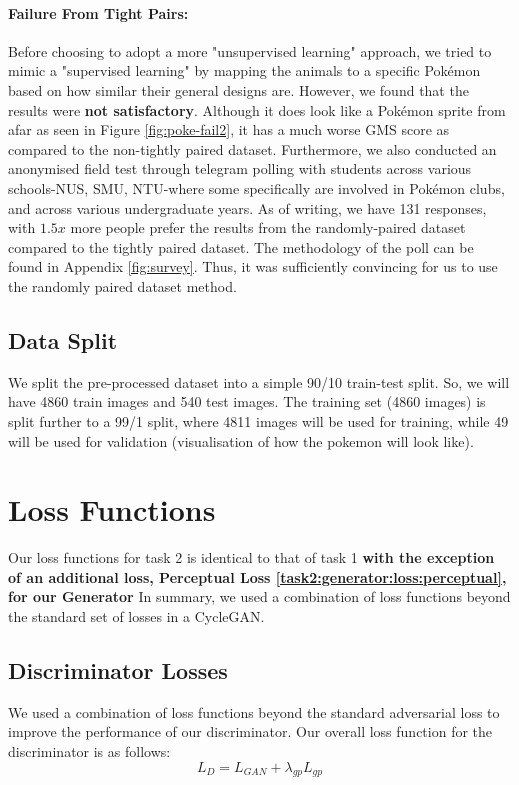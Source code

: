 \documentclass[twoside,english,notitlepage]{report}
\begin{document}
\paragraph{Failure From Tight Pairs:} Before choosing to adopt a more "unsupervised learning" approach, we tried to mimic a "supervised learning" by mapping the animals to a specific Pokémon based on how similar their general designs are. However, we found that the results were \textbf{not satisfactory}. Although it does look like a Pokémon sprite from afar as seen in Figure \ref{fig:poke-fail2}, it has a much worse GMS score as compared to the non-tightly paired dataset. Furthermore, we also conducted an anonymised field test through telegram polling with students across various schools-NUS, SMU, NTU-where some specifically are involved in Pokémon clubs, and across various undergraduate years. As of writing, we have 131 responses, with $1.5x$ more people prefer the results from the randomly-paired dataset compared to the tightly paired dataset. The methodology of the poll can be found in Appendix \ref{fig:survey}. Thus, it was sufficiently convincing for us to use the randomly paired dataset method.

\subsection{Data Split}

We split the pre-processed dataset into a simple 90/10 train-test split. So, we will have 4860 train images and 540 test images. The training set (4860 images) is split further to a 99/1 split, where 4811 images will be used for training, while 49 will be used for validation (visualisation of how the pokemon will look like). 


\section{Loss Functions}
Our loss functions for task 2 is identical to that of task 1 \textbf{with the exception of an additional loss, Perceptual Loss \ref{task2:generator:loss:perceptual}, for our Generator } In summary, we used a combination of loss functions beyond the standard set of losses in a CycleGAN. 

\subsection{Discriminator Losses}
We used a combination of loss functions beyond the standard adversarial loss to improve the performance of our discriminator. Our overall loss function for the discriminator is as follows:
\begin{equation}
    L_{D} = L_{GAN} + \lambda_{gp} L_{gp}
\end{equation}
\end{document}
